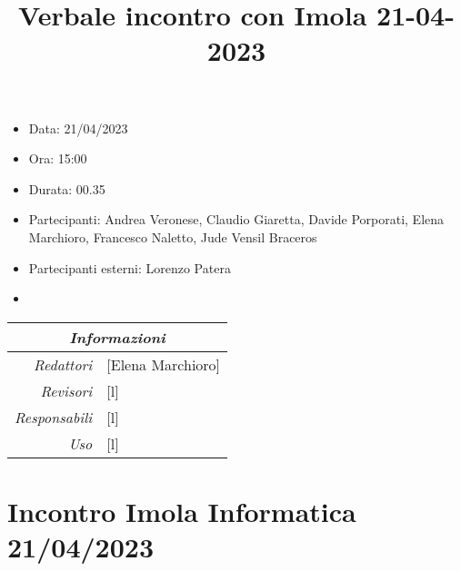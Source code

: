 \documentclass[12pt]{article}
\begin{document}
\graphicspath{ {../../templates/img} }

\title{Verbale incontro con Imola 21-04-2023}
\firstPage
\maketitle

\begin{center}
    \begin{itemize}
        \item[] Data: 21/04/2023
        \item[] Ora: 15:00
        \item[] Durata: 00.35
        \item[] Partecipanti: Andrea Veronese, Claudio Giaretta, Davide Porporati, Elena Marchioro, Francesco Naletto, Jude Vensil Braceros
        \item[] Partecipanti esterni: Lorenzo Patera
        \item[] 
        \end{itemize}
    \begin{tabular}{r | l}
		\multicolumn{2}{c}{\textit{Informazioni}}\\
		\hline
		
			\textit{Redattori} &
			[Elena Marchioro]\makecell{}\\
		
			\textit{Revisori} &
			[l]\makecell{}\\
			\textit{Responsabili} &
			[l]\makecell{}\\
		      \textit{Uso} & 
                [l]\makecell{}\\
\end{tabular}
\end{center}

\tableofcontents
\printindex
\section{Incontro Imola Informatica 21/04/2023}
\end{document}
